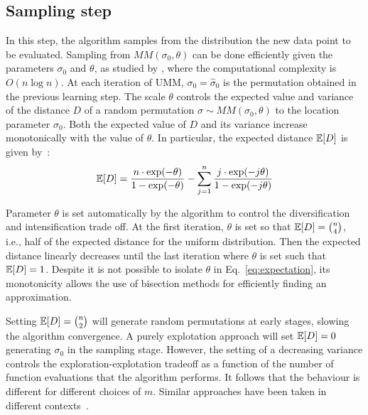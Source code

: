 \documentclass[sigconf,dvipsnames]{acmart}
\DeclareMathOperator*{\argmax}{arg\,max}
\begin{document}
\subsection{Sampling step}\label{sec:sampling}
In this step, the algorithm samples from the distribution the new data point to be evaluated. 
Sampling from $MM(\sigma_0,\theta)$  can be done efficiently given the parameters  $\sigma_0$ and $\theta$, as studied by \citet{IruCalLoz2016permallows}, where the computational complexity is $O(n\log n)$. %
%
At each iteration of UMM, $\sigma_0=\hat\sigma_0$ is the permutation obtained in the previous learning step. The scale $\theta$ controls the expected value and variance of the distance $D$ of a random permutation $\sigma\sim MM(\sigma_0, \theta)$ to the location parameter $\sigma_0$. Both  the expected value of $D$ and its variance increase monotonically with the value of $\theta$. In particular, the expected distance $\mathbb{E}[D]$ is given by~\cite{FliVer1986}:
%
\begin{equation}\label{eq:expectation}
\mathbb{E}[D] = \frac{n \cdot \exp(-\theta)}{1-\exp(-\theta)} - \sum_{j=1}^{n}  \frac{j\cdot\exp(-j  \theta)}{1-\exp(-j\theta)}
\end{equation}

Parameter $\theta$ is set automatically by the algorithm to control the diversification and intensification trade off. At the first iteration, $\theta$ is set so that  $\mathbb{E}[D] = \binom{n}{4}$, i.e., half of the expected distance for the uniform distribution. 
Then the expected distance linearly decreases until the last iteration where $\theta$ is set such that $\mathbb{E}[D] = 1$. Despite it is not possible to isolate $\theta$ in Eq.~\eqref{eq:expectation}, its monotonicity allows the use of bisection methods for efficiently finding an approximation. 

Setting $\mathbb{E}[D] = \binom{n}{2}$ will generate random permutations at early stages, slowing the algorithm convergence. 
A purely explotation approach will set $\mathbb{E}[D] = 0$  generating $\sigma_0$ in the sampling stage. However, the setting of a decreasing variance   controls the exploration-explotation tradeoff as a function of the number of function evaluations that the algorithm performs. It follows that the behaviour is different for different choices of $m$. Similar approaches have been taken in different contexts~\cite{ArzCebPer2019qap}. 

\end{document}
